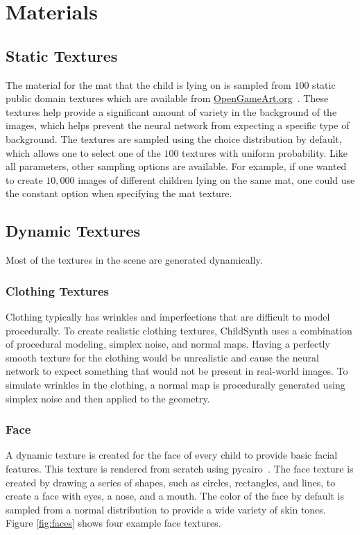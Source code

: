 \documentclass{article}
\begin{document}
\section{Materials}
\subsection{Static Textures}
The material for the mat that the child is lying on is sampled from $100$ static public domain textures which are available from \url{OpenGameArt.org}~\cite{100_seamless_textures}. These textures help provide a significant amount of variety in the background of the images, which helps prevent the neural network from expecting a specific type of background. The textures are sampled using the choice distribution by default, which allows one to select one of the $100$ textures with uniform probability. Like all parameters, other sampling options are available. For example, if one wanted to create $10,000$ images of different children lying on the same mat, one could use the constant option when specifying the mat texture.

\subsection{Dynamic Textures}

Most of the textures in the scene are generated dynamically. 

\subsubsection{Clothing Textures}

Clothing typically has wrinkles and imperfections that are difficult to model procedurally. To create realistic clothing textures, ChildSynth uses a combination of procedural modeling, simplex noise, and normal maps. Having a perfectly smooth texture for the clothing would be unrealistic and cause the neural network to expect something that would not be present in real-world images. To simulate wrinkles in the clothing, a normal map is procedurally generated using simplex noise and then applied to the geometry. 

\subsubsection{Face}

A dynamic texture is created for the face of every child to provide basic facial features. This texture is rendered from scratch using pycairo~\cite{pycairo}. The face texture is created by drawing a series of shapes, such as circles, rectangles, and lines, to create a face with eyes, a nose, and a mouth. The color of the face by default is sampled from a normal distribution to provide a wide variety of skin tones. Figure \ref{fig:faces} shows four example face textures.
\end{document}
